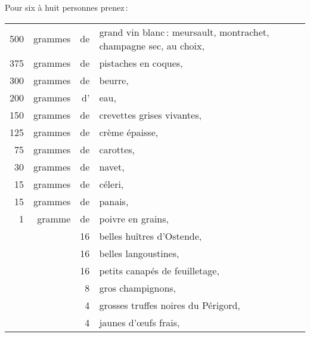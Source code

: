 Pour six à huit personnes prenez :

\medskip

\footnotesize
\begin{longtable}{rrrp{16em}}
    500 & grammes & de & grand vin blanc : meursault, montrachet, champagne sec, au choix,                \\
    375 & grammes & de & pistaches en coques,                                                             \\
    300 & grammes & de & beurre,                                                                          \\
    200 & grammes & d' & eau,                                                                             \\
    150 & grammes & de & crevettes grises vivantes,                                                       \\
    125 & grammes & de & crème épaisse,                                                                   \\
     75 & grammes & de & carottes,                                                                        \\
     30 & grammes & de & navet,                                                                           \\
     15 & grammes & de & céleri,                                                                          \\
     15 & grammes & de & panais,                                                                          \\
      1 & gramme  & de & poivre en grains,                                                                \\
        &         & 16 & belles huîtres d'Ostende,                                                        \\
        &         & 16 & belles langoustines,                                                             \\
        &         & 16 & petits canapés de feuilletage,                                                   \\
        &         &  8 & gros champignons,                                                                \\
        &         &  4 & grosses truffes noires du Périgord,                                              \\
        &         &  4 & jaunes d'œufs frais,                                                             \\

\end{longtable}
